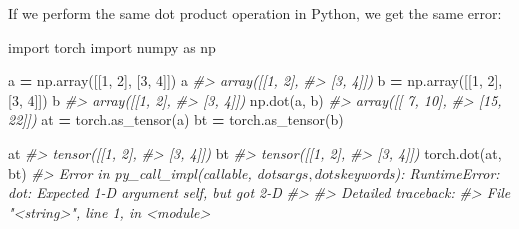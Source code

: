 \documentclass[]{book}
\newenvironment{Shaded}{\begin{snugshade}}{\end{snugshade}}
\newcommand{\CommentTok}[1]{\textcolor[rgb]{0.56,0.35,0.01}{\textit{#1}}}
\newcommand{\DecValTok}[1]{\textcolor[rgb]{0.00,0.00,0.81}{#1}}
\newcommand{\ImportTok}[1]{#1}
\newcommand{\KeywordTok}[1]{\textcolor[rgb]{0.13,0.29,0.53}{\textbf{#1}}}
\newcommand{\NormalTok}[1]{#1}
\newcommand{\OperatorTok}[1]{\textcolor[rgb]{0.81,0.36,0.00}{\textbf{#1}}}
\newcommand{\StringTok}[1]{\textcolor[rgb]{0.31,0.60,0.02}{#1}}
\begin{document}
If we perform the same dot product operation in Python, we get the same error:

\begin{Shaded}
\begin{Highlighting}[]
\ImportTok{import}\NormalTok{ torch}
\ImportTok{import}\NormalTok{ numpy }\ImportTok{as}\NormalTok{ np}

\NormalTok{a }\OperatorTok{=}\NormalTok{ np.array([[}\DecValTok{1}\NormalTok{, }\DecValTok{2}\NormalTok{], [}\DecValTok{3}\NormalTok{, }\DecValTok{4}\NormalTok{]])}
\NormalTok{a}
\CommentTok{#> array([[1, 2],}
\CommentTok{#>        [3, 4]])}
\NormalTok{b }\OperatorTok{=}\NormalTok{ np.array([[}\DecValTok{1}\NormalTok{, }\DecValTok{2}\NormalTok{], [}\DecValTok{3}\NormalTok{, }\DecValTok{4}\NormalTok{]])}
\NormalTok{b}
\CommentTok{#> array([[1, 2],}
\CommentTok{#>        [3, 4]])}
\NormalTok{np.dot(a, b)}
\CommentTok{#> array([[ 7, 10],}
\CommentTok{#>        [15, 22]])}
\NormalTok{at }\OperatorTok{=}\NormalTok{ torch.as_tensor(a)}
\NormalTok{bt }\OperatorTok{=}\NormalTok{ torch.as_tensor(b)}

\NormalTok{at}
\CommentTok{#> tensor([[1, 2],}
\CommentTok{#>         [3, 4]])}
\NormalTok{bt}
\CommentTok{#> tensor([[1, 2],}
\CommentTok{#>         [3, 4]])}
\NormalTok{torch.dot(at, bt)}
\CommentTok{#> Error in py_call_impl(callable, dots$args, dots$keywords): RuntimeError: dot: Expected 1-D argument self, but got 2-D}
\CommentTok{#> }
\CommentTok{#> Detailed traceback: }
\CommentTok{#>   File "<string>", line 1, in <module>}
\end{Highlighting}
\end{Shaded}

\begin{Shaded}
\end{Shaded}
\end{document}
